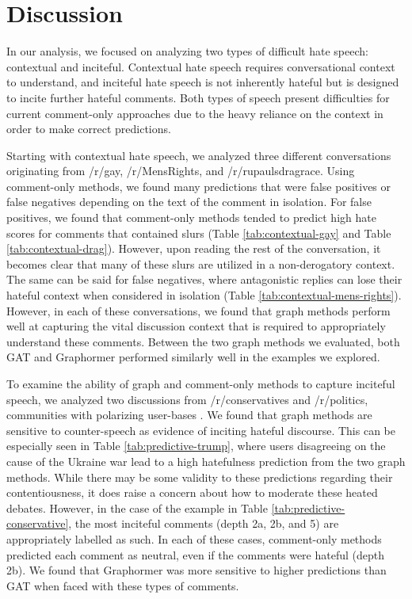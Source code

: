 \documentclass[letterpaper]{article} %
\begin{document}
\section{Discussion}
In our analysis, we focused on analyzing two types of difficult hate speech: contextual and inciteful. Contextual hate speech requires conversational context to understand, and inciteful hate speech is not inherently hateful but is designed to incite further hateful comments. Both types of speech present difficulties for current comment-only approaches due to the heavy reliance on the context in order to make correct predictions. 

Starting with contextual hate speech, we analyzed three different conversations originating from /r/gay, /r/MensRights, and /r/rupaulsdragrace. Using comment-only methods, we found many predictions that were false positives or false negatives depending on the text of the comment in isolation. For false positives, we found that comment-only methods tended to predict high hate scores for comments that contained slurs (Table \ref{tab:contextual-gay} and Table \ref{tab:contextual-drag}). However, upon reading the rest of the conversation, it becomes clear that many of these slurs are utilized in a non-derogatory context. The same can be said for false negatives, where antagonistic replies can lose their hateful context when considered in isolation (Table \ref{tab:contextual-mens-rights}). However, in each of these conversations, we found that graph methods perform well at capturing the vital discussion context that is required to appropriately understand these comments. Between the two graph methods we evaluated, both GAT and Graphormer performed similarly well in the examples we explored. 

To examine the ability of graph and comment-only methods to capture inciteful speech, we analyzed two discussions from /r/conservatives and /r/politics, communities with polarizing user-bases \cite{Waller2021}. We found that graph methods are sensitive to counter-speech as evidence of inciting hateful discourse. This can be especially seen in Table \ref{tab:predictive-trump}, where users disagreeing on the cause of the Ukraine war lead to a high hatefulness prediction from the two graph methods. While there may be some validity to these predictions regarding their contentiousness, it does raise a concern about how to moderate these heated debates. 
However, in the case of the example in Table \ref{tab:predictive-conservative}, the most inciteful comments (depth 2a, 2b, and 5) are appropriately labelled as such. In each of these cases, comment-only methods predicted each comment as neutral, even if the comments were hateful (depth 2b). We found that Graphormer was more sensitive to higher predictions than GAT when faced with these types of comments.  
\end{document}

